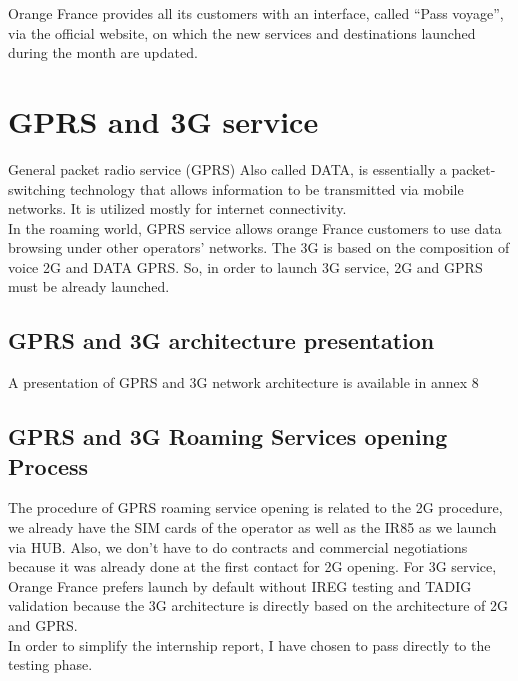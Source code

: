 Orange France provides all its customers with an interface, called “Pass voyage”, via the official website, on which the new services and destinations launched during the month are updated.\\

\section{\acs{GPRS} and \acs{3G} service}
\-\hspace{0.5cm} General packet radio service (\acs{GPRS}) Also called DATA, is essentially a packet-switching technology that allows information to be transmitted via mobile networks. It is utilized mostly for internet connectivity.\\

In the roaming world, \acs{GPRS} service allows orange France customers to use data browsing under other operators’ networks. The \acs{3G} is based on the composition of voice \acs{2G} and DATA \acs{GPRS}. So, in order to launch \acs{3G} service, \acs{2G} and \acs{GPRS} must be already launched. \\

\subsection{\acs{GPRS} and \acs{3G} architecture presentation}
A presentation of \acs{GPRS} and \acs{3G} network architecture is available in annex 8 \cite{annexes}

\subsection{\acs{GPRS} and \acs{3G} Roaming Services opening Process}
\-\hspace{0.5cm} The procedure of \acs{GPRS} roaming service opening is related to the \acs{2G} procedure, we already have the \acs{SIM} cards of the operator as well as the IR85 as we launch via HUB. Also, we don’t have to do contracts and commercial negotiations because it was already done at the first contact for \acs{2G} opening. For \acs{3G} service, Orange France prefers launch by default without \acs{IREG} testing and \acs{TADIG} validation because the \acs{3G} architecture is directly based on the architecture of \acs{2G} and \acs{GPRS}.\\

In order to simplify the internship report, I have chosen to pass directly to the testing phase.\\

